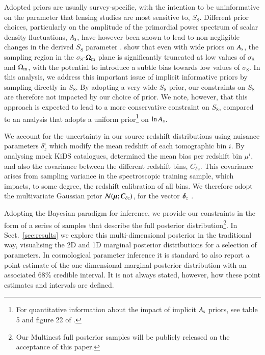 Adopted priors are usually survey-specific, with the intention to be uninformative on the parameter that lensing studies are most sensitive to, $S_8$.  
Different prior choices, particularly on the amplitude of the primordial power spectrum of scalar density fluctuations, $A_{\rm s}$, have however been shown to lead to non-negligible changes in the derived $S_8$ parameter \citep{joudaki/etal:2017,chang/etal:2019, joudaki/etal:2020, asgari/etal:2020_KD}. 
\citet{joachimi/etal:inprep} show that even with wide priors on $A_{\rm s}$,  the sampling region in the $\sigma_8$-$\Omega_{\rm m}$ plane is significantly truncated at low values of $\sigma_8$ and $\Omega_{\rm m}$, with the potential to introduce a subtle bias towards low values of $\sigma_8$.   In this analysis, we address this important issue of implicit informative priors by sampling directly in $S_8$.   By adopting a very wide $S_8$ prior, our constraints on $S_8$ are therefore not impacted by our choice of prior.  We note, however, that this approach is expected to lead to a more conservative constraint on $S_8$, compared to an analysis that adopts a uniform prior\footnote{For quantitative information about the impact of implicit $A_{\rm s}$ priors, see table 5 and figure 22 of \citet{joachimi/etal:inprep}.} on $\ln A_{\rm s}$.

We account for the uncertainty in our source redshift distributions using nuisance parameters $\delta_z^i$ which modify the mean redshift of each tomographic bin $i$.   By analysing mock KiDS catalogues, \citet{wright/etal:2020} determined the mean bias per redshift bin $\mu^i$, and also the covariance between the different redshift bins, $C_{\delta z}$.   This covariance arises from sampling variance in the spectroscopic training sample, which impacts, to some degree, the redshift calibration of all bins.    We therefore adopt the multivariate Gaussian prior ${\cal N}(\mbox{\boldmath $\mu$};\mbox{\boldmath $C$}_{\delta z})$, for the vector $\mbox{\boldmath $\delta$}_z$ \citep[see section 3 of,][for details]{hildebrandt/etal:inprep}. 

Adopting the Bayesian paradigm for inference, we provide our constraints in the form of a series of samples that describe the full posterior 
distribution\footnote{Our {\sc Multinest} full posterior samples will be publicly released on the acceptance of this paper.}.  
In Sect.~\ref{sec:results} we explore this multi-dimensional posterior in the traditional way, visualising the 2D and 1D marginal posterior distributions for a selection of parameters.  
In cosmological parameter inference it is standard to also report a point estimate of the one-dimensional marginal posterior distribution with an associated 68\% credible interval.   It
is not always stated, however, how these point estimates and intervals are defined.   

